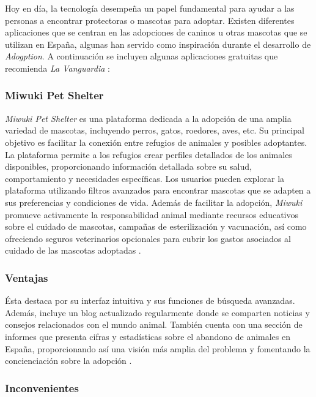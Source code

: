 \documentclass[a4paper, 12pt]{article}
\begin{document}
Hoy en día, la tecnología desempeña un papel fundamental para ayudar a las personas a encontrar protectoras o mascotas para adoptar. Existen diferentes aplicaciones que se centran en las adopciones de caninos u otras mascotas que se utilizan en España, algunas han servido como inspiración durante el desarrollo de \textit{Adogption}. A continuación se incluyen algunas aplicaciones gratuitas que recomienda \textit{La Vanguardia} \cite{lavanguardia}: 

\subsubsection*{Miwuki Pet Shelter}

\textit{Miwuki Pet Shelter} es una plataforma dedicada a la adopción de una amplia variedad de mascotas, incluyendo perros, gatos, roedores, aves, etc. Su principal objetivo es facilitar la conexión entre refugios de animales y posibles adoptantes. La plataforma permite a los refugios crear perfiles detallados de los animales disponibles, proporcionando información detallada sobre su salud, comportamiento y necesidades específicas. Los usuarios pueden explorar la plataforma utilizando filtros avanzados para encontrar mascotas que se adapten a sus preferencias y condiciones de vida. Además de facilitar la adopción, \textit{Miwuki} promueve activamente la responsabilidad animal mediante recursos educativos sobre el cuidado de mascotas, campañas de esterilización y vacunación, así como ofreciendo seguros veterinarios opcionales para cubrir los gastos asociados al cuidado de las mascotas adoptadas \cite{miwuki}.

\subsubsection*{Ventajas}

Ésta destaca por su interfaz intuitiva y sus funciones de búsqueda avanzadas. Además, incluye un blog actualizado regularmente donde se comparten noticias y consejos relacionados con el mundo animal. También cuenta con una sección de informes que presenta cifras y estadísticas sobre el abandono de animales en España, proporcionando así una visión más amplia del problema y fomentando la concienciación sobre la adopción \cite{lookerstudio}.

\subsubsection*{Inconvenientes}
\end{document}
